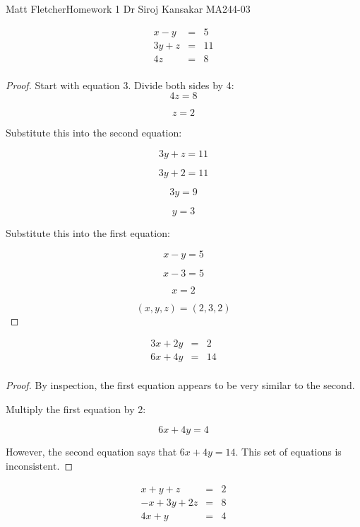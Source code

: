 \documentclass[8pt]{article}
\newenvironment{problem}[2][Problem]{\begin{trivlist}
\item[\hskip \labelsep {\bfseries #1}\hskip \labelsep {\bfseries #2.}]}{\end{trivlist}}
\begin{document}
Matt Fletcher\qquad Homework 1\qquad \qquad \qquad\qquad \qquad\qquad\qquad\qquad\qquad\qquad\qquad\qquad
Dr Siroj Kansakar \qquad
MA244-03\qquad

 
\begin{problem}{1.1.28}
\[
\begin{array}
	 {rcr} x-y & = & 5 \\ 
	     3y+z & = & 11 \\
       	4z  & = & 8 \\
\end{array}
\]
\end{problem}
 
\begin{proof}
Start with equation 3. Divide both sides by 4: \\
\[4z=8\]

\[\boxed{z=2}\]

Substitute this into the second equation:

\[3y+z = 11\]

\[3y+2=11\]

\[3y=9\]

\[\boxed{y=3}\]

Substitute this into the first equation:

\[x-y=5\]

\[x-3=5\]

\[\boxed{x=2}\]

\[\boxed{(x,y,z)=(2,3,2)}\]
\end{proof}



\begin{problem}{1.1.38}
	\[
	\begin{array}
	{lcr} 3x+2y & = & 2 \\ 
	6x+4y & = & 14 \\
	\end{array}
	\]
\end{problem}

\begin{proof}
	By inspection, the first equation appears to be very similar to the second. 
	
	Multiply the first equation by 2:
	
	\[6x+4y = 4\]
	
	However, the second equation says that $6x+4y = 14$. This set of equations is $\boxed{\text{inconsistent}}$.
\end{proof}

\begin{problem}{1.1.48}
\[	
	\begin{array}
	{lcr} 
	x+y+z& = & 2 \\ 
	-x+3y+2z & = & 8 \\
	4x+y & = & 4 \\
	\end{array}
\]
\end{problem}
\end{document}
